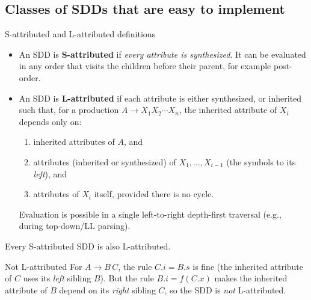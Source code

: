 \documentclass[11pt,a4paper]{article}
\newcommand{\at}[2]{\ensuremath{#1.\mathit{#2}}}
\begin{document}
\subsection{Classes of SDDs that are easy to implement}

\begin{defbox}{S-attributed and L-attributed definitions}
\begin{itemize}
\item An SDD is \textbf{S-attributed} if \emph{every attribute is synthesized}. It can be evaluated in any order that visits the children before their parent, for example post-order.
\item An SDD is \textbf{L-attributed} if each attribute is either synthesized, or inherited such that, for a production $A \to X_1 X_2 \cdots X_n$, the inherited attribute of $X_i$ depends only on:
 \begin{enumerate}[label=(\alph*),nosep]
 \item inherited attributes of $A$, and
 \item attributes (inherited or synthesized) of $X_1,\dots,X_{i-1}$ (the symbols to its \emph{left}), and
 \item attributes of $X_i$ itself, provided there is no cycle.
 \end{enumerate}
 Evaluation is possible in a single left-to-right depth-first traversal (e.g., during top-down/LL parsing).
\end{itemize}
Every S-attributed SDD is also L-attributed.
\end{defbox}

\begin{examplebox}{Not L-attributed}
For $A \to B\,C$, the rule $\at{C}{i} = \at{B}{s}$ is fine (the inherited attribute of $C$ uses its \emph{left} sibling $B$). But the rule $\at{B}{i} = f(\at{C}{x})$ makes the inherited attribute of $B$ depend on its \emph{right} sibling $C$, so the SDD is \emph{not} L-attributed.
\end{examplebox}
\end{document}
